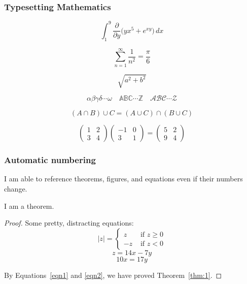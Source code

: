 \documentclass{beamer}  %
\begin{document}
\frame
{
  \frametitle{Typesetting Mathematics}

$$\int_{1}^{9} \frac{\partial}{\partial y}\Big(yx^5+e^{xy}\Big)\, dx$$ 

$$\sum_{n=1}^{\infty} \frac{1}{n^2} =\frac{\pi}{6}$$

$$\sqrt{a^{2} + b^{2}}$$

$$\alpha\beta\gamma\delta\cdots\omega\quad \mathbb{ABC\cdots Z}\quad \mathcal{ABC\cdots Z}$$

$$(A \cap B) \cup C = (A \cup C) \cap (B \cup C)$$

$$\begin{pmatrix} 1 & 2 \\ 3 & 4 \end{pmatrix}\begin{pmatrix} -1 & 0 \\ 3 & 1 \end{pmatrix}=\begin{pmatrix} 5 & 2 \\ 9 & 4 \end{pmatrix}$$

}

\frame
{
\frametitle{Automatic numbering}

I am able to reference theorems, figures, and equations even if their numbers change.



\begin{theorem}[]

I am a theorem.
\label{thm:1}
\end{theorem}
\begin{proof}
Some pretty, distracting equations:
\begin{equation*}\label{eqn0}
|z|=\begin{cases} 
z & \text{ if $z\geq 0$} \\
-z &\text{ if $z<0$}
\end{cases}
\end{equation*}
\begin{equation}\label{eqn1}
z=14x-7y
\end{equation}
\begin{equation}\label{eqn2}
10x=17y
\end{equation}

By Equations~\eqref{eqn1} and \eqref{eqn2}, we have proved Theorem~\ref{thm:1}.
\end{proof}


\vfill
}
\end{document}
